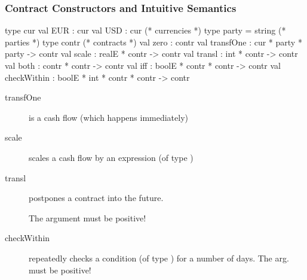\documentclass[xcolor=dvipsnames,11pt]{beamer}
\renewcommand{\emph}[1]{\textcolor{structure!60}{#1}}
\begin{document}
\begin{frame}[fragile,t]
    \frametitle{Contract Constructors and Intuitive Semantics}

\begin{mlcode}
  type cur val EUR : cur val USD : cur    (* currencies *)
  type party = string                     (* parties *)
  type contr                              (* contracts *)
  val zero        : contr             
  val transfOne   : cur * party * party -> contr
  val scale       : realE * contr -> contr
  val transl      : int * contr -> contr
  val both        : contr * contr -> contr
  val iff         : boolE * contr * contr -> contr
  val checkWithin : boolE * int * contr * contr -> contr
\end{mlcode}

\begin{description}
\item[transfOne] is a cash flow (which happens immediately)
\item[scale] scales a cash flow by an expression (of type )
\item[transl] postpones a contract into the \emph{future}.

    The  argument must be positive!

\item[checkWithin] repeatedly checks a condition (of type ) for a number of days.
    The  arg. must be positive!
\end{description}

\end{frame}
\end{document}
